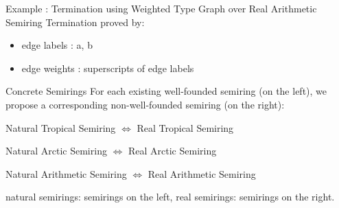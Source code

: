 \documentclass{beamer}
\newcommand{\graphbox}[8]{
  \begin{scope}[xshift=#2,yshift=#3]
    \draw [rounded corners=2mm] (0,0) rectangle (#4,-#5);
    \node at (0,0mm) [anchor=north west,inner sep=1mm] {#1};
    \begin{scope}[xshift=#4/2+#6,yshift=#7] 
    #8
    \end{scope}
  \end{scope}
}
\begin{document}
\begin{frame}{Example : Termination using Weighted Type Graph over Real Arithmetic Semiring}
  Termination proved by:
    \begin{center}
    \end{center}
    \begin{itemize}
      \item edge labels : a, b
      \item edge weights : superscripts of edge labels
    \end{itemize}
  

\end{frame}

\begin{frame}{Concrete Semirings}
  For each existing well-founded semiring (on the left), we propose a corresponding non-well-founded semiring (on the right):

  \begin{center}
     Natural Tropical Semiring $\Leftrightarrow$ Real Tropical Semiring
  \end{center}
  \begin{center}
     Natural Arctic Semiring $\Leftrightarrow$ Real Arctic Semiring
  \end{center}
  \begin{center}
    Natural Arithmetic Semiring $\Leftrightarrow$ Real Arithmetic Semiring
  \end{center}

  natural semirings: semirings on the left,
  real semirings: semirings on the right.
\end{frame}
\end{document}
